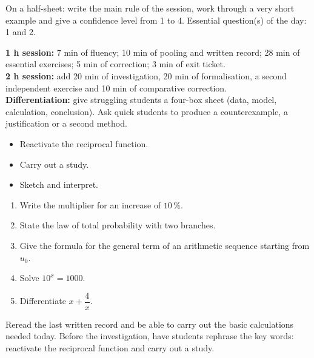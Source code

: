 \begin{sortie}On a half-sheet: write the main rule of the session, work through a very short example and give a confidence level from 1 to 4. Essential question(s) of the day: 1 and 2.\end{sortie}

\ifprof
\begin{methode}
\textbf{1 h session:} 7 min of fluency; 10 min of pooling and written record; 28 min of essential exercises; 5 min of correction; 3 min of exit ticket.\\
\textbf{2 h session:} add 20 min of investigation, 20 min of formalisation, a second independent exercise and 10 min of comparative correction.\\
\textbf{Differentiation:} give struggling students a four-box sheet (data, model, calculation, conclusion). Ask quick students to produce a counterexample, a justification or a second method.
\end{methode}
\fi
{}
\begin{objectifs}\begin{itemize}\item Reactivate the reciprocal function.\item Carry out a study.\item Sketch and interpret.\end{itemize}\end{objectifs}
\begin{automatismes}\begin{enumerate}\item Write the multiplier for an increase of $10\,\%$. \item State the law of total probability with two branches. \item Give the formula for the general term of an arithmetic sequence starting from $u_0$. \item Solve $10^x=1000$. \item Differentiate $x+\dfrac4x$. \end{enumerate}\end{automatismes}
\begin{prerequis}Reread the last written record and be able to carry out the basic calculations needed today. Before the investigation, have students rephrase the key words: reactivate the reciprocal function and carry out a study.\end{prerequis}

